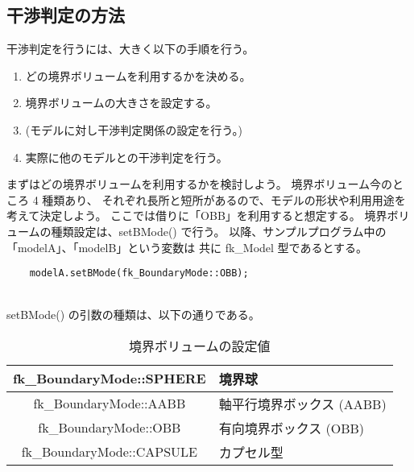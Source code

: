 \subsection{干渉判定の方法}
干渉判定を行うには、大きく以下の手順を行う。
\begin{enumerate}
 \item どの境界ボリュームを利用するかを決める。
 \item 境界ボリュームの大きさを設定する。
 \item (モデルに対し干渉判定関係の設定を行う。)
 \item 実際に他のモデルとの干渉判定を行う。
\end{enumerate}
まずはどの境界ボリュームを利用するかを検討しよう。
境界ボリューム今のところ 4 種類あり、
それぞれ長所と短所があるので、モデルの形状や利用用途を考えて決定しよう。
ここでは借りに「OBB」を利用すると想定する。
境界ボリュームの種類設定は、setBMode() で行う。
以降、サンプルプログラム中の「modelA」、「modelB」という変数は
共に fk\_Model 型であるとする。
\\
\begin{breakbox}
\begin{verbatim}
    modelA.setBMode(fk_BoundaryMode::OBB);
\end{verbatim}
\end{breakbox}
~ \\
setBMode() の引数の種類は、以下の通りである。
\begin{table}[H]
\caption{境界ボリュームの設定値}
\label{tbl:bmode}
\begin{center}
\begin{tabular}{|c|l|}
\hline
fk\_BoundaryMode::SPHERE & 境界球 \\ \hline
fk\_BoundaryMode::AABB & 軸平行境界ボックス (AABB) \\ \hline
fk\_BoundaryMode::OBB & 有向境界ボックス (OBB) \\ \hline
fk\_BoundaryMode::CAPSULE & カプセル型 \\ \hline
\end{tabular}
\end{center}
\end{table}

